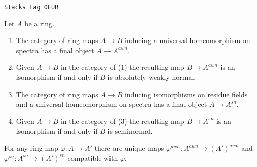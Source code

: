 \begin{lemma}
\label{morphisms-lemma-seminormalization-ring}
\href{https://stacks.math.columbia.edu/tag/0EUR}{\texttt{Stacks tag 0EUR}}

Let $A$ be a ring.
\begin{enumerate}
\item The category of ring maps $A \to B$ inducing a
universal homeomorphism on spectra has a final object $A \to A^{awn}$.
\item Given $A \to B$ in the category of (1) the resulting map
$B \to A^{awn}$ is an isomorphism if and only if $B$ is
absolutely weakly normal.
\item The category of ring maps $A \to B$ inducing isomorphisms on
residue fields and a universal homeomorphism on spectra has a final
object $A \to A^{sn}$.
\item Given $A \to B$ in the category of (3) the resulting map
$B \to A^{sn}$ is an isomorphism if and only if $B$ is seminormal.
\end{enumerate}
For any ring map $\varphi : A \to A'$ there are unique maps
$\varphi^{awn} : A^{awn} \to (A')^{awn}$ and
$\varphi^{sn} : A^{sn} \to (A')^{sn}$ compatible with $\varphi$.
\end{lemma}

